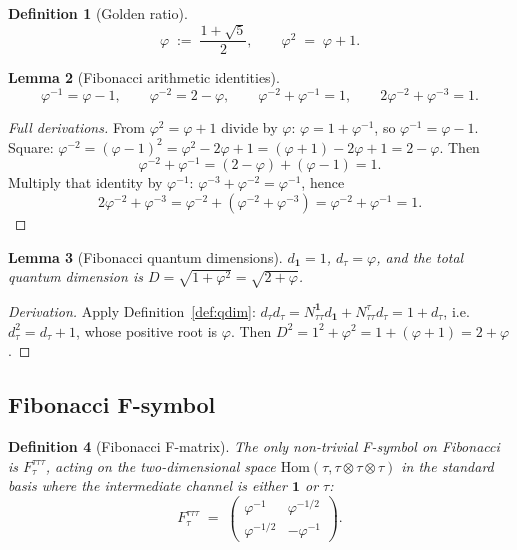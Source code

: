 \documentclass[11pt,a4paper]{article}
\newtheorem{definition}{Definition}[section]
\newtheorem{lemma}[definition]{Lemma}
\theoremstyle{definition}
\newcommand{\Hom}{\mathrm{Hom}}
\newcommand{\one}{\mathbf{1}}
\begin{document}
\begin{definition}[Golden ratio]\label{def:phi}
\[
\varphi \;:=\; \frac{1+\sqrt 5}{2}, \qquad
\varphi^{2} \;=\; \varphi + 1.
\]
\end{definition}

\begin{lemma}[Fibonacci arithmetic identities]\label{lem:fib-arith}
\[
\varphi^{-1} = \varphi - 1, \qquad
\varphi^{-2} = 2 - \varphi, \qquad
\varphi^{-2} + \varphi^{-1} = 1, \qquad
2\varphi^{-2} + \varphi^{-3} = 1.
\]
\end{lemma}

\begin{proof}[Full derivations]
From $\varphi^{2}=\varphi+1$ divide by $\varphi$:
$\varphi = 1+\varphi^{-1}$, so $\varphi^{-1}=\varphi-1$.
Square: $\varphi^{-2} = (\varphi-1)^{2} = \varphi^{2}-2\varphi+1
= (\varphi+1)-2\varphi+1 = 2-\varphi$. Then
\[
\varphi^{-2}+\varphi^{-1} = (2-\varphi) + (\varphi-1) = 1.
\]
Multiply that identity by $\varphi^{-1}$:
$\varphi^{-3}+\varphi^{-2} = \varphi^{-1}$, hence
\[
2\varphi^{-2}+\varphi^{-3}
= \varphi^{-2} + (\varphi^{-2}+\varphi^{-3})
= \varphi^{-2}+\varphi^{-1} = 1.
\]
\end{proof}

\begin{lemma}[Fibonacci quantum dimensions]\label{lem:fib-qdim}
$d_{\one}=1$, $d_\tau = \varphi$, and the total quantum dimension is
$D = \sqrt{1+\varphi^{2}} = \sqrt{2+\varphi}$.
\end{lemma}

\begin{proof}[Derivation]
Apply Definition~\ref{def:qdim}: $d_\tau d_\tau = N_{\tau\tau}^{\one} d_\one
+ N_{\tau\tau}^{\tau} d_\tau = 1 + d_\tau$, i.e.\ $d_\tau^{2} = d_\tau + 1$,
whose positive root is $\varphi$. Then $D^{2} = 1^{2}+\varphi^{2}
= 1+(\varphi+1) = 2+\varphi$.
\end{proof}

\subsection{Fibonacci F-symbol}

\begin{definition}[Fibonacci F-matrix]\label{def:fib-F}
The only non-trivial F-symbol on Fibonacci is $F^{\tau\tau\tau}_{\tau}$,
acting on the two-dimensional space $\Hom(\tau,\tau\otimes\tau\otimes\tau)$
in the standard basis where the intermediate channel is either $\one$ or
$\tau$:
\[
F^{\tau\tau\tau}_{\tau} \;=\;
\begin{pmatrix} \varphi^{-1} & \varphi^{-1/2}\\[2pt]
                \varphi^{-1/2} & -\varphi^{-1}\end{pmatrix}.
\]
\end{definition}
\end{document}
